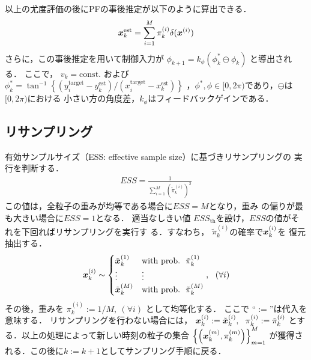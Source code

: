 \documentclass[a4paper,10pt,twocolumn,fleqn]{jsarticle}
\def\vec#1{\mbox{\boldmath$#1$}}
\def\vec#1{\mbox{\boldmath$#1$}}
\begin{document}
以上の尤度評価の後にPFの事後推定が以下のように算出できる．
\begin{align}
 \vec{x}_k^{\text{est}}=\sum_{i=1}^M \pi^{(i)}_{k}\delta (\vec{x}^{(i)})
\end{align}
さらに，この事後推定を用いて制御入力が
$
 \phi_{k+1}=k_{\phi} 
 \left(\phi_k^* \ominus \phi_k\right)$
と導出される\cite{peter}．
ここで，
$
 v_k=\text{const.}
$
および
$
 \phi_k^*=\tan^{-1} \left\{
 \left(
 y^{\text{target}}_i-y^{\text{est}}_k
 \right)/
 \left(
 x^{\text{target}}_i-x^{\text{est}}_k
 \right)\right\}
$
，$\phi^*,\phi \in [0, 2\pi)$であり，$\ominus$は$[0, 2\pi)$における
小さい方の角度差，$k_\phi$はフィードバックゲインである．

\vspace{-4mm}
\subsection{リサンプリング}
\vspace{-2mm}
有効サンプルサイズ（ESS: effective sample size）\cite{Liu}に基づきリサンプリングの
実行を判断する．
\begin{align}
 ESS=\frac{1}{\sum_{i=1}^M\left(\tilde{\pi}_k^{(i)}\right)^2}
\end{align}
この値は，全粒子の重みが均等である場合に$ESS=M$となり，重み
の偏りが最も大きい場合に$ESS=1$となる．
適当なしきい値
$ESS_{\text{th}}$を設け，$ESS$の値がそれを下回ればリサンプリングを実行す
る．すなわち，
$\tilde{\pi}^{(i)}_{k}$の確率で$\vec{x}^{(i)}_{k}$を
復元抽出する．
  \begin{align}
   \vec{x}_k^{(i)} \sim
   \begin{cases}
    \tilde{\vec{x}}_k^{(1)} & \mathrm{with\ prob.} \ \ \tilde{\pi}_k^{(1)}\\
    \vdots & \vdots \\
    \tilde{\vec{x}}_k^{(M)} & \mathrm{with\ prob.} \ \ \tilde{\pi}_k^{(M)}
   \end{cases},
   \ \ (\forall i)
  \end{align}
その後，重みを
$
      \pi_k^{(i)}:= 1/M, \ (\forall i)
$
として均等化する．
ここで
``$:=$''は代入を意味する．
リサンプリングを行わない場合には，
$      \vec{x}_k^{(i)}:=\tilde{\vec{x}}_k^{(i)},\ \ 
      \pi_k^{(i)}:=\tilde{\pi}_k^{(i)}
$     とする．以上の処理によって新しい時刻の粒子の集合
$
  \left\{ \left( \vec{x}^{(m)}_k, \pi^{(m)}_{k} \right)
  \right\}_{m=1}^{M} 
$
が獲得される．この後に$k:=k+1$としてサンプリング手順に戻る．



\vspace{-4mm}
\end{document}
